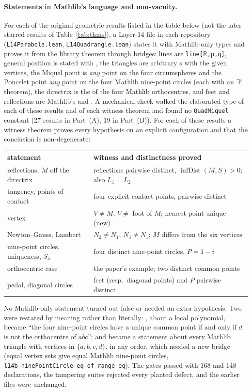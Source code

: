\documentclass[11pt]{article}
\theoremstyle{definition}
\theoremstyle{remark}
\newcommand{\lean}[1]{\texttt{#1}}
\newcommand{\RR}{\mathbb{R}}
\begin{document}
\paragraph{Statements in Mathlib's language and non-vacuity.} For each of the original geometric
results listed in the table below (not the later starred results of Table~\ref{tab:thms}), a Layer-14 file in
each repository (\lean{L14Parabola.lean}, \lean{L14Quadrangle.lean}) states it with Mathlib-only types
and proves it from the library theorem through bridges: lines are \lean{line[$\RR$,p,q]}, general
position is stated with , the triangles are arbitrary
s with the given vertices, the Miquel point is \emph{any} point on the four
circumspheres and the Poncelet point \emph{any} point on the four Mathlib nine-point circles (each with
an $\exists!$ theorem), the directrix is the  of the four Mathlib orthocentres, and
feet and reflections are Mathlib's  and
. A mechanical check walked the elaborated type of each of these
results and of each witness theorem and found no \lean{QuadMiquel} constant (27 results in Part~(A), 19
in Part~(B)). For each of these results a witness theorem proves every hypothesis on an explicit
configuration and that the conclusion is non-degenerate:
\begin{center}\footnotesize
\begin{tabular}{ll}
\toprule
statement & witness and distinctness proved\\
\midrule
reflections, $M$ off the directrix & reflections pairwise distinct, $\operatorname{infDist}(M,S)>0$; also $L_1\perp L_2$\\
tangency, points of contact & four explicit contact points, pairwise distinct\\
vertex & $V\neq M$, $V\neq$ foot of $M$; nearest point unique (new)\\
Newton--Gauss, Lambert & $N_2\neq N_1$, $N_3\neq N_1$; $M$ differs from the six vertices\\
nine-point circles, uniqueness, $S_4$ & four distinct nine-point circles, $P=1-i$\\
orthocentric case & the paper's example; two distinct common points\\
pedal, diagonal circles & feet (resp.\ diagonal points) and $P$ pairwise distinct\\
\bottomrule
\end{tabular}
\end{center}
No Mathlib-only statement turned out false or needed an extra hypothesis. Two were restated by meaning
rather than literally: , about a local polynomial, became ``the
four nine-point circles have a unique common point if and only if $d$ is not the orthocentre of
$abc$''; and  became a statement about every Mathlib triangle with vertices
in $\{a,b,c,d\}$, in any order, which needed a new bridge (equal vertex sets give equal Mathlib
nine-point circles, \lean{l14b\_ninePointCircle\_eq\_of\_range\_eq}). The gates passed with 168 and 148
declarations, the tampering suites rejected every planted defect, and the earlier files were unchanged.
\end{document}
